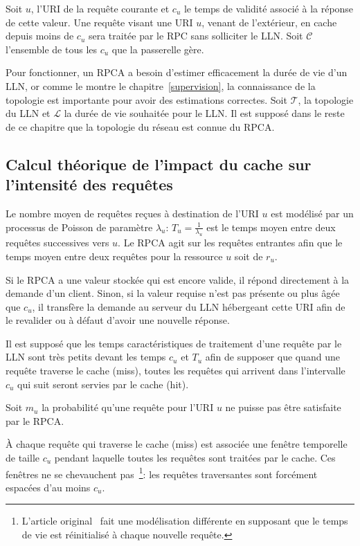 Soit $u$, l'\ac{URI} de la requête courante et $c_u$ le temps de validité associé à la réponse de cette valeur.
Une requête visant une \ac{URI} $u$, venant de l'extérieur, en cache depuis moins de $c_u$ sera traitée par le \ac{RPC} sans solliciter le \ac{LLN}.
Soit $\mathcal{C}$ l'ensemble de tous les $c_u$ que la passerelle gère.

Pour fonctionner, un \ac{RPCA} a besoin d'estimer efficacement la durée de vie d'un \ac{LLN}, or comme le montre le chapitre~\ref{supervision}, la connaissance de la topologie est importante pour avoir des estimations correctes.
Soit $\mathcal{T}$, la topologie du \ac{LLN} et $\mathcal{L}$ la durée de vie souhaitée pour le \ac{LLN}.
Il est supposé dans le reste de ce chapitre que la topologie du réseau est connue du \ac{RPCA}.

\subsection{Calcul théorique de l'impact du cache sur l'intensité des requêtes}
\label{cache:simple}

Le nombre moyen de requêtes reçues à destination de l'\ac{URI} $u$ est modélisé par un processus de Poisson de paramètre $\lambda_u$: $T_u = \frac{1}{\lambda_u}$ est le temps moyen entre deux requêtes successives vers $u$.
Le \ac{RPCA} agit sur les requêtes entrantes afin que le temps moyen entre deux requêtes pour la ressource $u$ soit de $r_u$.

Si le \ac{RPCA} a une valeur stockée qui est encore valide, il répond directement à la demande d'un client.
Sinon, si la valeur requise n'est pas présente ou plus âgée que $c_u$, il transfère la demande au serveur du \ac{LLN} hébergeant cette \ac{URI} afin de le revalider ou à défaut d'avoir une nouvelle réponse.

Il est supposé que les temps caractéristiques de traitement d'une requête par le \ac{LLN} sont très petits devant les temps $c_u$ et $T_u$ afin de supposer que quand une requête traverse le cache (miss), toutes les requêtes qui arrivent dans l'intervalle $c_u$ qui suit seront servies par le cache (hit).

Soit $m_u$ la probabilité qu'une requête pour l'\ac{URI} $u$ ne puisse pas être satisfaite par le \ac{RPCA}.

À chaque requête qui traverse le cache (miss) est associée une fenêtre temporelle de taille $c_u$ pendant laquelle toutes les requêtes sont traitées par le cache.
Ces fenêtres ne se chevauchent pas~\footnote{L'article original~\cite{leone2013optimizing} fait une modélisation différente en supposant que le temps de vie est réinitialisé à chaque nouvelle requête.}: les requêtes traversantes sont forcément espacées d'au moins $c_u$.

